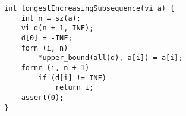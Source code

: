 \begin{verbatim}
int longestIncreasingSubsequence(vi a) {
	int n = sz(a);
	vi d(n + 1, INF);
	d[0] = -INF;
	forn (i, n) 
		*upper_bound(all(d), a[i]) = a[i];
	fornr (i, n + 1)
		if (d[i] != INF)
			return i;
	assert(0);
}
\end{verbatim}
